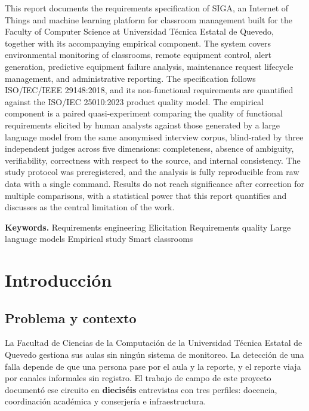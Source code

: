 \documentclass[11pt,a4paper]{article}
\begin{document}
This report documents the requirements specification of SIGA, an Internet of Things and
machine learning platform for classroom management built for the Faculty of Computer
Science at Universidad T\'ecnica Estatal de Quevedo, together with its accompanying
empirical component. The system covers environmental monitoring of classrooms, remote
equipment control, alert generation, predictive equipment failure analysis, maintenance
request lifecycle management, and administrative reporting. The specification follows
ISO/IEC/IEEE 29148:2018, and its non-functional requirements are quantified against the
ISO/IEC 25010:2023 product quality model. The empirical component is a paired
quasi-experiment comparing the quality of functional requirements elicited by human
analysts against those generated by a large language model from the same anonymised
interview corpus, blind-rated by three independent judges across five dimensions:
completeness, absence of ambiguity, verifiability, correctness with respect to the
source, and internal consistency. The study protocol was preregistered, and the analysis
is fully reproducible from raw data with a single command. Results do not reach
significance after correction for multiple comparisons, with a statistical power that
this report quantifies and discusses as the central limitation of the work.

\textbf{Keywords.} Requirements engineering \textbullet{} Elicitation \textbullet{}
Requirements quality \textbullet{} Large language models \textbullet{} Empirical study
\textbullet{} Smart classrooms

\newpage
\tableofcontents
\newpage
\listoftables
\listoffigures
\newpage

\section{Introducci\'on}

\subsection{Problema y contexto}

La Facultad de Ciencias de la Computaci\'on de la Universidad T\'ecnica Estatal de
Quevedo gestiona sus aulas sin ning\'un sistema de monitoreo. La detecci\'on de una
falla depende de que una persona pase por el aula y la reporte, y el reporte viaja por
canales informales sin registro. El trabajo de campo de este proyecto document\'o ese
circuito en \textbf{diecis\'eis} entrevistas con tres perfiles: docencia, coordinaci\'on
acad\'emica y conserjer\'ia e infraestructura.
\end{document}

